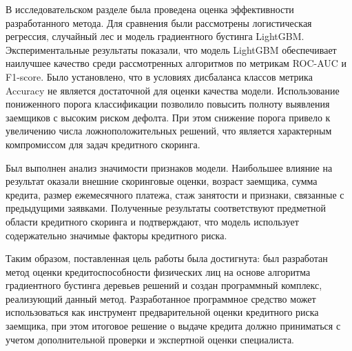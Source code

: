 В исследовательском разделе была проведена оценка эффективности разработанного метода. Для сравнения были рассмотрены логистическая регрессия, случайный лес и модель градиентного бустинга LightGBM. Экспериментальные результаты показали, что модель LightGBM обеспечивает наилучшее качество среди рассмотренных алгоритмов по метрикам ROC-AUC и F1-score. Было установлено, что в условиях дисбаланса классов метрика Accuracy не является достаточной для оценки качества модели. Использование пониженного порога классификации позволило повысить полноту выявления заемщиков с высоким риском дефолта. При этом снижение порога привело к увеличению числа ложноположительных решений, что является характерным компромиссом для задач кредитного скоринга.

Был выполнен анализ значимости признаков модели. Наибольшее влияние на результат оказали внешние скоринговые оценки, возраст заемщика, сумма кредита, размер ежемесячного платежа, стаж занятости и признаки, связанные с предыдущими заявками. Полученные результаты соответствуют предметной области кредитного скоринга и подтверждают, что модель использует содержательно значимые факторы кредитного риска.

Таким образом, поставленная цель работы была достигнута: был разработан метод оценки кредитоспособности физических лиц на основе алгоритма градиентного бустинга деревьев решений и создан программный комплекс, реализующий данный метод. Разработанное программное средство может использоваться как инструмент предварительной оценки кредитного риска заемщика, при этом итоговое решение о выдаче кредита должно приниматься с учетом дополнительной проверки и экспертной оценки специалиста.
